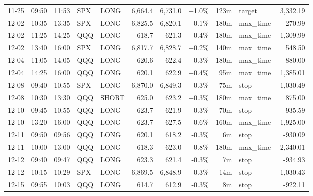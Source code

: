 \documentclass[11pt,a4paper,twoside]{article}
\begin{document}
\begin{center}
\begin{longtable}{>{\color{txtmain}}l l l l l r r r r >{\color{txtmain}}l r}
11-25 & 09:50 & 11:53 & SPX & LONG & 6,664.4 & 6,731.0 & \textcolor{wingreen}{+1.0\%} & 123m & target & \textcolor{wingreen}{3,332.19} \\
12-02 & 10:35 & 13:35 & SPX & LONG & 6,825.5 & 6,820.1 & \textcolor{lossred}{-0.1\%} & 180m & max\_time & \textcolor{lossred}{-270.99} \\
12-02 & 11:25 & 14:25 & QQQ & LONG & 618.7 & 621.3 & \textcolor{wingreen}{+0.4\%} & 180m & max\_time & \textcolor{wingreen}{1,309.99} \\
12-02 & 13:40 & 16:00 & SPX & LONG & 6,817.7 & 6,828.7 & \textcolor{wingreen}{+0.2\%} & 140m & max\_time & \textcolor{wingreen}{548.50} \\
12-04 & 11:05 & 14:05 & QQQ & LONG & 620.6 & 622.4 & \textcolor{wingreen}{+0.3\%} & 180m & max\_time & \textcolor{wingreen}{880.00} \\
12-04 & 14:25 & 16:00 & QQQ & LONG & 620.1 & 622.9 & \textcolor{wingreen}{+0.4\%} & 95m & max\_time & \textcolor{wingreen}{1,385.01} \\
12-08 & 09:40 & 10:55 & SPX & LONG & 6,870.0 & 6,849.3 & \textcolor{lossred}{-0.3\%} & 75m & stop & \textcolor{lossred}{-1,030.49} \\
12-08 & 10:30 & 13:30 & QQQ & SHORT & 625.0 & 623.2 & \textcolor{wingreen}{+0.3\%} & 180m & max\_time & \textcolor{wingreen}{875.00} \\
12-10 & 09:45 & 10:55 & QQQ & LONG & 623.7 & 621.9 & \textcolor{lossred}{-0.3\%} & 70m & stop & \textcolor{lossred}{-935.59} \\
12-10 & 13:20 & 16:00 & QQQ & LONG & 623.7 & 627.5 & \textcolor{wingreen}{+0.6\%} & 160m & max\_time & \textcolor{wingreen}{1,925.00} \\
12-11 & 09:50 & 09:56 & QQQ & LONG & 620.1 & 618.2 & \textcolor{lossred}{-0.3\%} & 6m & stop & \textcolor{lossred}{-930.09} \\
12-11 & 10:00 & 13:00 & QQQ & LONG & 618.3 & 623.0 & \textcolor{wingreen}{+0.8\%} & 180m & max\_time & \textcolor{wingreen}{2,340.01} \\
12-12 & 09:40 & 09:47 & QQQ & LONG & 623.3 & 621.4 & \textcolor{lossred}{-0.3\%} & 7m & stop & \textcolor{lossred}{-934.93} \\
12-12 & 10:15 & 10:29 & SPX & LONG & 6,869.5 & 6,848.9 & \textcolor{lossred}{-0.3\%} & 14m & stop & \textcolor{lossred}{-1,030.43} \\
12-15 & 09:55 & 10:03 & QQQ & LONG & 614.7 & 612.9 & \textcolor{lossred}{-0.3\%} & 8m & stop & \textcolor{lossred}{-922.11} \\

\end{longtable}
\end{center}
\end{document}
